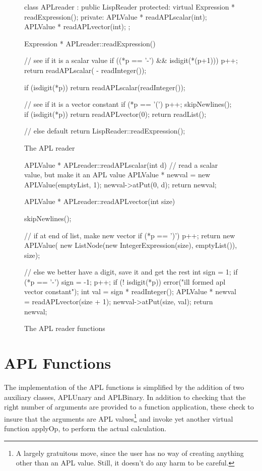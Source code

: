 \begin{figure}
\begin{cprog}
class APLreader : public LispReader {
protected:
	virtual Expression * readExpression();
private:
	APLValue * readAPLscalar(int);
	APLValue * readAPLvector(int);
};

Expression * APLreader::readExpression()
{
	// see if it is a scalar value
	if ((*p == '-') && isdigit(*(p+1))) {
		p++;
		return readAPLscalar( - readInteger());
		}

	if (isdigit(*p))
		return readAPLscalar(readInteger());

	// see if it is a vector constant
	if (*p == '(') {
		p++; 
		skipNewlines();
		if (isdigit(*p))
			return readAPLvector(0);
		return readList();
		}

	// else default
	return LispReader::readExpression();
}
\end{cprog}
\caption{The APL reader}\label{aplreader}
\end{figure}

\begin{figure}
\begin{cprog}
APLValue * APLreader::readAPLscalar(int d)
{
	// read a scalar value, but make it an APL value
	APLValue * newval = new APLValue(emptyList, 1);
	newval->atPut(0, d);
	return newval;
}

APLValue * APLreader::readAPLvector(int size)
{
	skipNewlines();

	// if at end of list, make new vector
	if (*p == ')') {
		p++;
		return new APLValue(
			new ListNode(new IntegerExpression(size), emptyList()),
			size);
		}

	// else we better have a digit, save it and get the rest
	int sign = 1;
	if (*p == '-') { sign = -1; p++; }
	if (! isdigit(*p))
		error("ill formed apl vector constant");
	int val = sign * readInteger();
	APLValue * newval = readAPLvector(size + 1);
	newval->atPut(size, val);
	return newval;
}
\end{cprog}
\caption{The APL reader functions}\label{readvector}
\end{figure}

\section{APL Functions}

The implementation of the APL functions is simplified by the addition of
two auxiliary classes, {\sf APLUnary} and {\sf APLBinary}.   In addition
to checking that the right number of arguments are provided to a function
application, these check to insure that the arguments are APL
values\footnote{A largely gratuitous move, since the user has no way of
creating anything other than an APL value.  Still, it doesn't do any harm
to be careful.} and invoke yet another virtual function {\sf applyOp}, to
perform the actual calculation.

